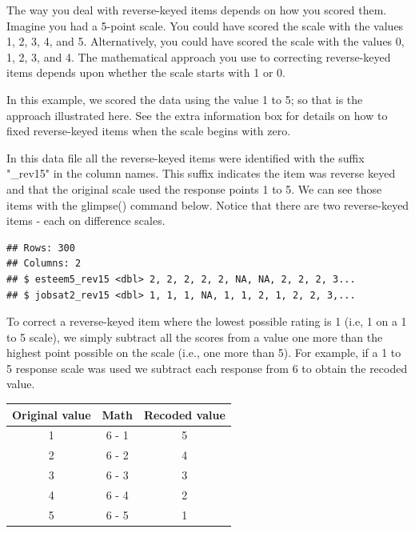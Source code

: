 \documentclass[
]{krantz}
\makeatletter
\newenvironment{Shaded}{\begin{snugshade}}{\end{snugshade}}
\newcommand{\KeywordTok}[1]{\textcolor[rgb]{0.27,0.27,0.27}{\textbf{#1}}}
\newcommand{\NormalTok}[1]{#1}
\newcommand{\OperatorTok}[1]{\textcolor[rgb]{0.43,0.43,0.43}{\textbf{#1}}}
\newcommand{\StringTok}[1]{\textcolor[rgb]{0.5,0.5,0.5}{#1}}
\newenvironment{kframe}{%
\medskip{}
\setlength{\fboxsep}{.8em}
 \def\at@end@of@kframe{}%
 \ifinner\ifhmode%
  \def\at@end@of@kframe{\end{minipage}}%
  \begin{minipage}{\columnwidth}%
 \fi\fi%
 \def\FrameCommand##1{\hskip\@totalleftmargin \hskip-\fboxsep
 \colorbox{shadecolor}{##1}\hskip-\fboxsep
     \hskip-\linewidth \hskip-\@totalleftmargin \hskip\columnwidth}%
 \MakeFramed {\advance\hsize-\width
   \@totalleftmargin\z@ \linewidth\hsize
   \@setminipage}}%
 {\par\unskip\endMakeFramed%
 \at@end@of@kframe}
\renewenvironment{Shaded}{\begin{kframe}}{\end{kframe}}
\makeatother
\begin{document}
The way you deal with reverse-keyed items depends on how you scored them. Imagine you had a 5-point scale. You could have scored the scale with the values 1, 2, 3, 4, and 5. Alternatively, you could have scored the scale with the values 0, 1, 2, 3, and 4. The mathematical approach you use to correcting reverse-keyed items depends upon whether the scale starts with 1 or 0.

In this example, we scored the data using the value 1 to 5; so that is the approach illustrated here. See the extra information box for details on how to fixed reverse-keyed items when the scale begins with zero.

In this data file all the reverse-keyed items were identified with the suffix "\_rev15" in the column names. This suffix indicates the item was reverse keyed and that the original scale used the response points 1 to 5. We can see those items with the glimpse() command below. Notice that there are two reverse-keyed items - each on difference scales.

\begin{Shaded}
\end{Shaded}

\begin{verbatim}
## Rows: 300
## Columns: 2
## $ esteem5_rev15 <dbl> 2, 2, 2, 2, 2, NA, NA, 2, 2, 2, 3...
## $ jobsat2_rev15 <dbl> 1, 1, 1, NA, 1, 1, 2, 1, 2, 2, 3,...
\end{verbatim}

To correct a reverse-keyed item where the lowest possible rating is 1 (i.e, 1 on a 1 to 5 scale), we simply subtract all the scores from a value one more than the highest point possible on the scale (i.e., one more than 5). For example, if a 1 to 5 response scale was used we subtract each response from 6 to obtain the recoded value.

\begin{longtable}[]{@{}ccc@{}}
\toprule
Original value & Math & Recoded value\tabularnewline
\midrule
\endhead
1 & 6 - 1 & 5\tabularnewline
2 & 6 - 2 & 4\tabularnewline
3 & 6 - 3 & 3\tabularnewline
4 & 6 - 4 & 2\tabularnewline
5 & 6 - 5 & 1\tabularnewline
\bottomrule
\end{longtable}
\end{document}
